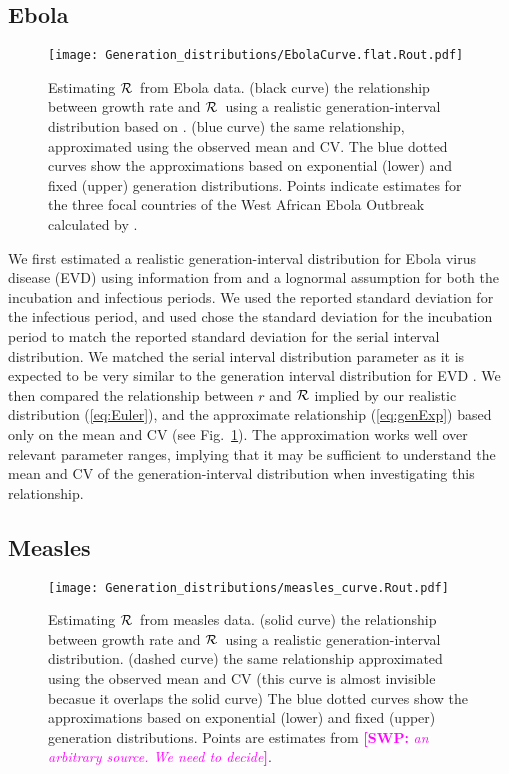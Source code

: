 \documentclass[12pt,]{article}
\newcommand{\RR}{\ensuremath{{\cal R}}}
\newcommand{\eref}[1]{(\ref{eq:#1})}
\newcommand{\fref}[1]{Fig.~\ref{fig:#1}}
\newcommand{\comment}[3]{\textcolor{#1}{\textbf{[#2: }\textit{#3}\textbf{]}}}
\newcommand{\swp}[1]{\comment{magenta}{SWP}{#1}}
\begin{document}
\subsection{Ebola}

\begin{figure}[htbp] \centering
	\texttt{[image: Generation\_distributions/EbolaCurve.flat.Rout.pdf]}
	\caption{Estimating \RR~from Ebola data.
(black curve) the relationship between growth rate and \RR~using a realistic generation-interval distribution based on \cite{WHO14}.
(blue curve) the same relationship, approximated using the observed mean and CV. 
The blue dotted curves show the approximations based on exponential (lower) and fixed (upper) generation distributions.
Points indicate estimates for the three focal countries of the West African Ebola Outbreak calculated by \cite{WHO14}.
	\label{fig:EbolaCurve}}
\end{figure}

We first estimated a realistic generation-interval distribution for Ebola virus disease (EVD) using information from \cite{WHO14} and a lognormal assumption for both the incubation and infectious periods.
We used the reported standard deviation for the infectious period, and used chose the standard deviation for the incubation period to match the reported standard deviation for the serial interval distribution.
We matched the serial interval distribution parameter as it is expected to be very similar to the generation interval distribution for EVD \cite{WHO14}.
We  then compared the relationship between $r$ and $\RR$ implied by our realistic distribution \eref{Euler}, and the approximate relationship \eref{genExp} based only on the mean and CV (see \fref{EbolaCurve}). The approximation works well over relevant parameter ranges, implying that it may be sufficient to understand the mean and CV of the generation-interval distribution when investigating this relationship.

\subsection{Measles}

\begin{figure}[htbp] \centering
	\texttt{[image: Generation\_distributions/measles\_curve.Rout.pdf]}
	\caption{Estimating \RR~from measles data.
		(solid curve) the relationship between growth rate and \RR~using a realistic generation-interval distribution.
		(dashed curve) the same relationship approximated using the observed mean and CV (this curve is almost invisible becasue it overlaps the solid curve)
		The blue dotted curves show the approximations based on exponential (lower) and fixed (upper) generation distributions.
		Points are estimates from \swp{an arbitrary source. We need to decide}.
	}
	\label{fig:measlesCurve}
\end{figure}
\end{document}
